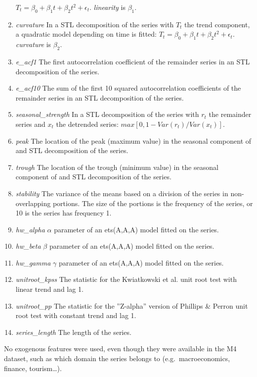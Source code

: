 \documentclass[11pt,a4paper,]{article}
\theoremstyle{definition}
\theoremstyle{definition}
\theoremstyle{definition}
\theoremstyle{remark}
\begin{document}
\begin{enumerate}
  \(T_t = \beta_{0} + \beta_{1}t + \beta_{2}t^2 + \epsilon_t\).
  \emph{linearity} is \(\beta_{1}\).
\item
  \emph{curvature} In a STL decomposition of the series with \(T_t\) the
  trend component, a quadratic model depending on time is fitted:
  \(T_t = \beta_{0} + \beta_{1}t + \beta_{2}t^2 + \epsilon_t\).
  \emph{curvature} is \(\beta_{2}\).
\item
  \emph{e\_acf1} The first autocorrelation coefficient of the remainder
  series in an STL decomposition of the series.
\item
  \emph{e\_acf10} The sum of the first 10 squared autocorrelation
  coefficients of the remainder series in an STL decomposition of the
  series.
\item
  \emph{seasonal\_strength} In a STL decomposition of the series with
  \(r_t\) the remainder series and \(x_t\) the detrended series:
  \(max[0, 1- Var(r_t) / Var(x_t)]\).
\item
  \emph{peak} The location of the peak (maximum value) in the seasonal
  component of and STL decomposition of the series.
\item
  \emph{trough} The location of the trough (minimum value) in the
  seasonal component of and STL decomposition of the series.
\item
  \emph{stability} The variance of the means based on a division of the
  series in non-overlapping portions. The size of the portions is the
  frequency of the series, or 10 is the series has frequency 1.
\item
  \emph{hw\_alpha} \(\alpha\) parameter of an ets(A,A,A) model fitted on
  the series.
\item
  \emph{hw\_beta} \(\beta\) parameter of an ets(A,A,A) model fitted on
  the series.
\item
  \emph{hw\_gamma} \(\gamma\) parameter of an ets(A,A,A) model fitted on
  the series.
\item
  \emph{unitroot\_kpss} The statistic for the Kwiatkowski et al. unit
  root test with linear trend and lag 1.
\item
  \emph{unitroot\_pp} The statistic for the ''Z-alpha'' version of
  Phillips \& Perron unit root test with constant trend and lag 1.
\item
  \emph{series\_length} The length of the series.
\end{enumerate}

No exogenous features were used, even though they were available in the
M4 dataset, such as which domain the series belongs to
(e.g.~macroeconomics, finance, tourism\ldots{}).
\end{document}
